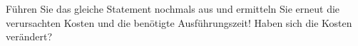     \item F\"uhren Sie das gleiche Statement nochmals aus und ermitteln Sie erneut die verursachten Kosten und die ben\"otigte Ausf\"uhrungszeit! Haben sich die Kosten ver\"andert?
